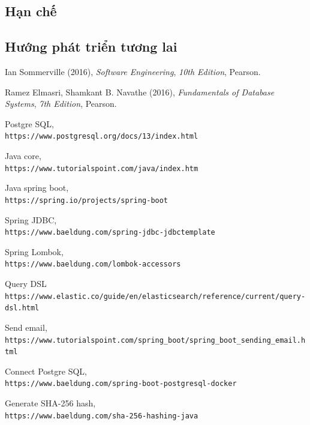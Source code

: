 \documentclass[a4paper,12pt,fleqn,print,oneside]{extarticle}
\begin{document}
\subsection{Hạn chế}


\subsection{Hướng phát triển tương lai}


	
\newpage
{}

\begin{thebibliography}{80}

 Ian Sommerville (2016), \textit{Software Engineering}, \textit{10th Edition}, Pearson.

 Ramez Elmasri, Shamkant B. Navathe (2016), \textit{Fundamentals of Database Systems}, \textit{7th Edition}, Pearson.

 Postgre SQL, \\\texttt{https://www.postgresql.org/docs/13/index.html}

 Java core, \\\texttt{https://www.tutorialspoint.com/java/index.htm}

 Java spring boot, \\\texttt{https://spring.io/projects/spring-boot}

 Spring JDBC, \\\texttt{https://www.baeldung.com/spring-jdbc-jdbctemplate}

 Spring Lombok, \\\texttt{https://www.baeldung.com/lombok-accessors}

 Query DSL \\\texttt{https://www.elastic.co/guide/en/elasticsearch/reference/current/query-dsl.html}

 Send email, \\\texttt{https://www.tutorialspoint.com/spring\_boot/spring\_boot\_sending\_email.html}

 Connect Postgre SQL, \\\texttt{https://www.baeldung.com/spring-boot-postgresql-docker}

 Generate SHA-256 hash, \\\texttt{https://www.baeldung.com/sha-256-hashing-java}


\end{thebibliography}
\end{document}
